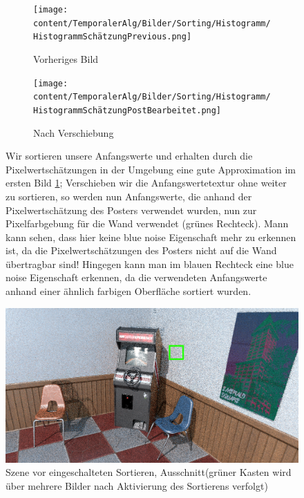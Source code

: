 \begin{figure}[H]
    \centering
    \begin{subfigure}{0.4\textwidth}
        \centering\texttt{[image: content/TemporalerAlg/Bilder/Sorting/Histogramm/HistogrammSchätzungPrevious.png]} 
        \caption{Vorheriges Bild}
        \label{fig:Histogramm_Previous}
    \end{subfigure}
    \centering
    \begin{subfigure}{0.4\textwidth}
        \centering\texttt{[image: content/TemporalerAlg/Bilder/Sorting/Histogramm/HistogrammSchätzungPostBearbeitet.png]}
        \caption{Nach Verschiebung}
        \label{fig:Histogram_Post}
    \end{subfigure}
    \caption{Wir sortieren unsere Anfangswerte und erhalten durch die Pixelwertschätzungen in der Umgebung eine gute Approximation im ersten Bild
    \ref{fig:Histogramm_Previous}; Verschieben wir die Anfangswertetextur ohne weiter zu sortieren, so werden nun Anfangswerte, die anhand der Pixelwertschätzung des
    Posters verwendet wurden, nun zur Pixelfarbgebung für die Wand verwendet (grünes Rechteck). Mann kann sehen, dass hier keine blue noise Eigenschaft mehr zu erkennen
    ist, da die Pixelwertschätzungen des Posters nicht auf die Wand übertragbar sind! Hingegen kann man im blauen Rechteck eine blue noise Eigenschaft erkennen, da 
    die verwendeten Anfangswerte anhand einer ähnlich farbigen Oberfläche sortiert wurden.} 
    \label{fig:Vergleich der Histogramme}
\end{figure}


\newpage

\begin{figure}[H]
        \centering \includegraphics[scale=.25]{content/TemporalerAlg/Bilder/Sorting/Szene/Szene1.png}
        \caption{Szene vor eingeschalteten Sortieren, Ausschnitt(grüner Kasten wird über mehrere 
        Bilder nach Aktivierung des Sortierens verfolgt)}
        \label{fig:Nur_Sorting_Szene_t1}
\end{figure}

